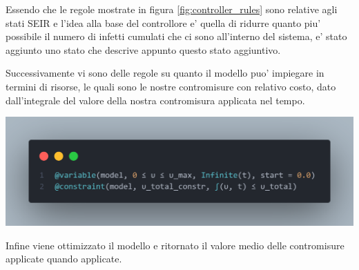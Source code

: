 Essendo che le regole mostrate in figura \ref{fig:controller_rules} sono relative agli stati 
SEIR e l'idea alla base del controllore e' quella di ridurre quanto piu' possibile il numero di
infetti cumulati che ci sono all'interno del sistema, e' stato aggiunto uno stato che descrive
appunto questo stato aggiuntivo.

Successivamente vi sono delle regole su quanto il modello puo' impiegare in termini di risorse, 
le quali sono le nostre contromisure con relativo costo, dato dall'integrale del valore della nostra
contromisura applicata nel tempo.

\begin{minipage}{\linewidth}
	\centering
	\includegraphics[width=\textwidth]{img/controller_rules_1.png}
	\label{fig:controller_rules_1}
\end{minipage}

Infine viene ottimizzato il modello e ritornato il valore medio delle contromisure applicate
quando applicate.